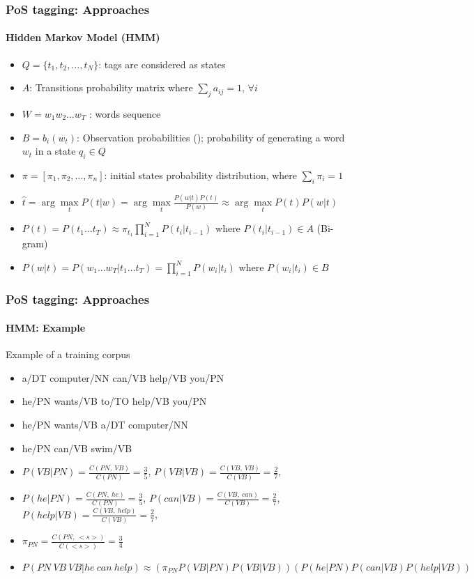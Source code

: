 \documentclass[xcolor=table]{beamer}
\begin{document}
\begin{frame}[fragile]
\frametitle{PoS tagging: Approaches}
\framesubtitle{Hidden Markov Model (HMM)}

\begin{itemize}
	\item $Q = \{t_1, t_2, \ldots, t_N\}$: tags are considered as states
	\item $A$: Transitions probability matrix where $\sum_j a_{ij} = 1,\, \forall i$
	\item $W = w_1 w_2 \ldots w_T$ : words sequence
	\item $B = b_i(w_t)$: Observation probabilities (); probability of generating a word $w_t$ in a state $q_i \in Q$
	\item $\pi = [\pi_1, \pi_2, \ldots, \pi_n ]$: initial states probability distribution, where $\sum_i \pi_i = 1$
	
	\item $\hat{t} = \arg\max\limits_t P(t | w) = \arg\max\limits_t \frac{P(w|t) P(t)}{P(w)} \approx \arg\max\limits_t P(t) P(w|t)$
	\item $P(t) = P(t_1 \ldots t_T) \approx \pi_{t_1} \prod\limits_{i=1}^N P(t_i|t_{i-1}) $ where $P(t_i|t_{i-1}) \in A$ (Bi-gram) 
	\item $P(w|t) = P(w_1 \ldots w_T|t_1 \ldots t_T) = \prod\limits_{i=1}^N P(w_i|t_i) $ where $P(w_i|t_i) \in B$
\end{itemize}



\end{frame}

\begin{frame}
\frametitle{PoS tagging: Approaches}
\framesubtitle{HMM: Example}

\begin{exampleblock}{Example of a training corpus}
	\begin{itemize}
		\item a/DT computer/NN can/VB help/VB you/PN
		\item he/PN wants/VB to/TO help/VB you/PN
		\item he/PN wants/VB a/DT computer/NN
		\item he/PN can/VB swim/VB
	\end{itemize}
\end{exampleblock}

\begin{itemize}
	\item $P(VB | PN) = \frac{C(PN,\ VB)}{C(PN)} = \frac{3}{5}$, 
		  $P(VB | VB) = \frac{C(VB,\ VB)}{C(VB)} = \frac{2}{7}$,
	\item $P(he | PN) = \frac{C(PN,\ he)}{C(PN)} = \frac{3}{5}$,
	      $P(can | VB) = \frac{C(VB,\ can)}{C(VB)} = \frac{2}{7}$,
		  $P(help | VB) = \frac{C(VB,\ help)}{C(VB)} = \frac{2}{7}$,
	\item $\pi_{PN} = \frac{C(PN,\ <s>)}{C(<s>)} = \frac{3}{4} $
	\item $P(PN\ VB\ VB | he\ can\ help) \approx (\pi_{PN} P(VB | PN) P(VB | VB)) (P(he | PN) P(can | VB) P(help | VB)) $
\end{itemize}

\end{frame}
\end{document}
